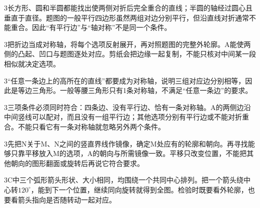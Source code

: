 \documentclass[multi=snippet,border={5bp 20bp 5bp 5bp}]{standalone}
\newenvironment{snippet}[3]{\begin{minipage}{#1bp}\color{answerred}\fontsize{#2}{#3}\selectfont\raggedright}{\end{minipage}}
\begin{document}
\begin{snippet}{505}{11.5}{14}\begin{multicols}{3}\raggedcolumns 长方形、圆和半圆都能找出使两侧对折后完全重合的直线；半圆的轴经过圆心且垂直于直径。题图的一般平行四边形虽然两组对边分别平行，但沿直线对折通常不能重合。因此“有平行边”与“轴对称”不是同一个条件。\end{multicols}\end{snippet}
\begin{snippet}{505}{11.5}{14}\begin{multicols}{3}\raggedcolumns 把折边当成对称轴，将每个选项反射展开，再对照题图的完整外轮廓。A能使两侧的凸起、凹口与题图逐处对应。剪纸会把边缘一起复制，不能只核对中间某一段相似就决定选项。\end{multicols}\end{snippet}
\begin{snippet}{505}{11.5}{14}\begin{multicols}{3}\raggedcolumns “任意一条边上的高所在的直线”都要成为对称轴，说明三组对应边分别相等，因此是等边三角形。一般等腰三角形只有1条对称轴，不满足“任意一条边”的要求。\end{multicols}\end{snippet}
\begin{snippet}{505}{11.5}{14}\begin{multicols}{3}\raggedcolumns 三项条件必须同时符合：四条边、没有平行边、恰有一条对称轴。A的两侧边沿中间竖线可以配对，而且没有一组平行边；其他选项分别有平行边或不能对折重合。不能只看它有一条对称轴就忽略另外两个条件。\end{multicols}\end{snippet}
\begin{snippet}{505}{11.5}{14}\begin{multicols}{3}\raggedcolumns 先把N关于M、N之间的竖直界线作镜像，确定M处应有的轮廓和朝向。再寻找能够只靠平移放入M的选项，A的朝向与所需镜像一致。平移只改变位置，不能把其他朝向的图形翻面或旋转后再说它符合要求。\end{multicols}\end{snippet}
\begin{snippet}{505}{11.5}{14}\begin{multicols}{3}\raggedcolumns C中三个弧形箭头形状、大小相同，均围绕一个共同中心排列。把一个箭头绕中心转\(120^\circ\)\allowbreak ，能到下一个位置，继续同向旋转就得到全图。检验时既要看外轮廓，也要看箭头指向是否随转动一起对应。\end{multicols}\end{snippet}
\end{document}
